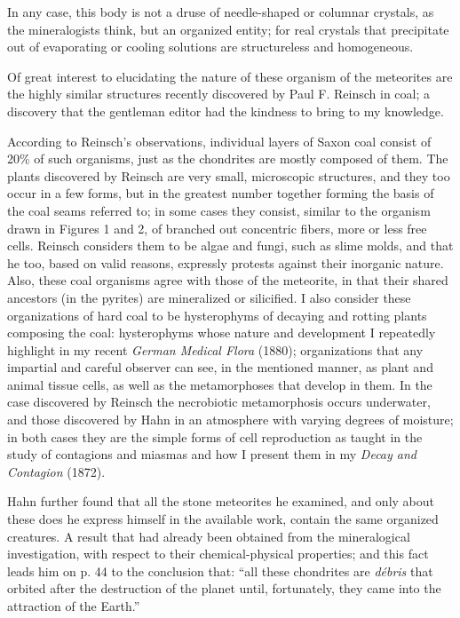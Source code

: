 \documentclass[a4paper, 12pt, oneside]{article}
\begin{document}
In any case, this body is not a druse of needle-shaped or columnar crystals, as the mineralogists think, but an organized entity; for real crystals that precipitate out of evaporating or cooling solutions are structureless and homogeneous.

Of great interest to elucidating the nature of these organism of the meteorites are the highly similar structures recently discovered by Paul F. Reinsch in coal; a discovery that the gentleman editor had the kindness to bring to my knowledge.

According to Reinsch's observations, individual layers of Saxon coal consist of 20\% of such organisms, just as the chondrites are mostly composed of them. The plants discovered by Reinsch are very small, microscopic structures, and they too occur in a few forms, but in the greatest number together forming the basis of the coal seams referred to; in some cases they consist, similar to the organism drawn in Figures 1 and 2, of branched out concentric fibers, more or less free cells. Reinsch considers them to be algae and fungi, such as slime molds, and that he too, based on valid reasons, expressly protests against their inorganic nature. Also, these coal organisms agree with those of the meteorite, in that their shared ancestors (in the pyrites) are mineralized or silicified. I also consider these organizations of hard coal to be hysterophyms of decaying and rotting plants composing the coal: hysterophyms whose nature and development I repeatedly highlight in my recent \emph{German Medical Flora} (1880); organizations that any impartial and careful observer can see, in the mentioned manner, as plant and animal tissue cells, as well as the metamorphoses that develop in them. In the case discovered by Reinsch the necrobiotic metamorphosis occurs underwater, and those discovered by Hahn in an atmosphere with varying degrees of moisture; in both cases they are the simple forms of cell reproduction as taught in the study of contagions and miasmas and how I present them in my \emph{Decay and Contagion} (1872).

Hahn further found that all the stone meteorites he examined, and only about these does he express himself in the available work, contain the same organized creatures. A result that had already been obtained from the mineralogical investigation, with respect to their chemical-physical properties; and this fact leads him on p. 44 to the conclusion that: ``all these chondrites are \emph{débris} that orbited after the destruction of the planet until, fortunately, they came into the attraction of the Earth.''
\end{document}
